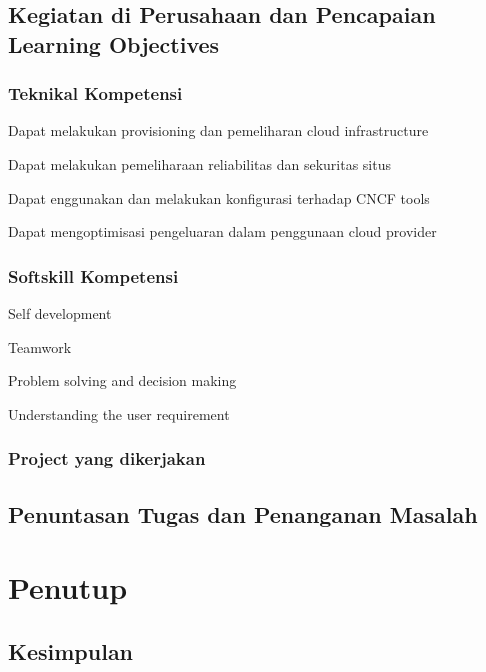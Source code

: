 \documentclass{monthlyReport}
\begin{document}
\subsection{Kegiatan di Perusahaan dan Pencapaian Learning Objectives}
    \subsubsection{Teknikal Kompetensi}
        \begin{modlist}
            \item Dapat melakukan provisioning dan pemeliharan cloud infrastructure
            \item Dapat melakukan pemeliharaan reliabilitas dan sekuritas situs
            \item Dapat enggunakan dan melakukan konfigurasi terhadap CNCF tools
            \item Dapat mengoptimisasi pengeluaran dalam penggunaan cloud provider
        \end{modlist}
        
    \subsubsection{Softskill Kompetensi}
        \begin{modlist}
            \item Self development
            \item Teamwork
            \item Problem solving and decision making
            \item Understanding the user requirement
        \end{modlist}
        
    \subsubsection{Project yang dikerjakan}

\subsection{Penuntasan Tugas dan Penanganan Masalah}

\section{Penutup}
    \subsection{Kesimpulan}
\end{document}
